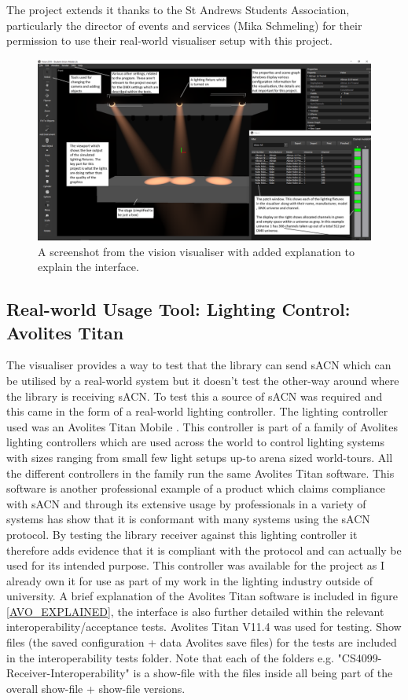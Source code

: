 \documentclass[11pt,a4paper]{article}
\begin{document}
The project extends it thanks to the St Andrews Students Association, particularly the director of events and services (Mika Schmeling) for their permission to use their real-world visualiser setup with this project.

\begin{figure}[H]
	\label{VISION_EXPLAINED}
	\includegraphics[width=\textwidth]{vision_explained}
	\caption{A screenshot from the vision visualiser with added explanation to explain the interface.}
\end{figure}

\subsection{Real-world Usage Tool: Lighting Control: Avolites Titan}
The visualiser provides a way to test that the library can send sACN which can be utilised by a real-world system but it doesn't test the other-way around where the library is receiving sACN. To test this a source of sACN was required and this came in the form of a real-world lighting controller. The lighting controller used was an Avolites Titan Mobile \cite{AVO_TITAN_MOBILE}. This controller is part of a family of Avolites lighting controllers which are used across the world to control lighting systems with sizes ranging from small few light setups up-to arena sized world-tours. All the different controllers in the family run the same Avolites Titan software. This software is another professional example of a product which claims compliance with sACN and through its extensive usage by professionals in a variety of systems has show that it is conformant with many systems using the sACN protocol. By testing the library receiver against this lighting controller it therefore adds evidence that it is compliant with the protocol and can actually be used for its intended purpose. This controller was available for the project as I already own it for use as part of my work in the lighting industry outside of university. A brief explanation of the Avolites Titan software is included in figure \ref{AVO_EXPLAINED}, the interface is also further detailed within the relevant interoperability/acceptance tests. Avolites Titan V11.4 was used for testing. Show files (the saved configuration + data Avolites save files) for the tests are included in the interoperability tests folder. Note that each of the folders e.g. "CS4099-Receiver-Interoperability" is a show-file with the files inside all being part of the overall show-file + show-file versions.
\end{document}
